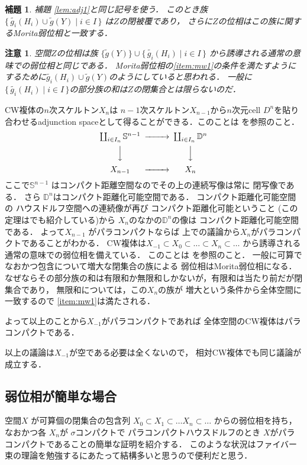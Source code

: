 \documentclass[leqno, a4paper, 12pt]{jsarticle}
\newtheorem{lem}[thm]{補題}
\newtheorem*{rmk}{注意}
\begin{document}
\begin{lem}
補題
\ref{lem:adj1}と同じ記号を使う．
このとき族$\{\, \widetilde{g_{i}}(H_{i})\cup \widetilde{g}(Y)\mid i\in I\, \}$
は$Z$の閉被覆であり，
さらに$Z$の位相はこの族に関するMorita弱位相と一致する．
\end{lem}
\begin{rmk}
空間$Z$の位相は族
$\{\widetilde{g}(Y)\}\cup \{\, \widetilde{g_{i}}(H_{i})\mid i\in I\, \}$
から誘導される通常の意味での弱位相と同じである．
Morita弱位相の\ref{item:mw1}の条件を満たすようにするために$\widetilde{g_{i}}(H_{i})\cup \widetilde{g}(Y)$のようにしていると思われる．
一般に$ \{\, \widetilde{g_{i}}(H_{i})\mid i\in I\, \}$の部分族の和は$Z$の閉集合とは限らないのだ．
\end{rmk}

CW複体の$n$次スケルトン$X_{n}$は
$n-1$次スケルトン$X_{n-1}$から$n$次元cell
$D^{n}$を貼り合わせるadjunction spaceとして得ることができる．このことは
\cite[Theorem 2.4, p.47]{MR3822092}を参照のこと．
\[
  \begin{CD}
     \coprod_{i\in I_{n}}\mathbb{S}^{n-1} @>>> \coprod_{i\in I_{n}}\mathbb{D}^{n} \\
  @VVV    @VVV \\
     X_{n-1}   @>>>  X_{n}
  \end{CD}
\]
ここで$\mathbb{S}^{n-1}$
はコンパクト距離空間なのでその上の連続写像は常に
閉写像である．
さら
$\mathbb{D}^{n}$はコンパクト距離化可能空間である．
コンパクト距離化可能空間の
ハウスドルフ空間への連続像が再び
コンパクト距離化可能ということ
(この定理は\cite{Den3}でも紹介している)から
$X_{n}$のなかの$\mathbb{D}^{n}$の像は
コンパクト距離化可能空間である．
よって$X_{n-1}$
がパラコンパクトならば
上での議論から$X_{n}$がパラコンパクトであることがわかる．
CW複体は$X_{-1}\subset X_{0}\subset \dots \subset X_{n}\subset \dots $
から誘導される通常の意味での弱位相を備えている．
このことは
\cite[Theorem 2.4, p.47]{MR3822092}を参照のこと．
一般に可算でなおかつ包含について増大な閉集合の族による
弱位相はMorita弱位相になる．なぜならその部分族の和は有限和か無限和しかないが，有限和は当たり前だが閉集合であり，
無限和については，この$X_{n}$の族が
増大という条件から全体空間に一致するので
\ref{item:mw1}は満たされる．


よって以上のことから$X_{-1}$がパラコンパクトであれば
全体空間のCW複体はパラコンパクトである．


以上の議論は$X_{-1}$が空である必要は全くないので，
相対CW複体でも同じ議論が成立する．


\subsection{弱位相が簡単な場合}
空間$X$
が可算個の閉集合の包含列
$X_{0}\subset X_{1}\subset \dots X_{n}\subset \dots$
からの弱位相を持ち，なおかつ各
$X_{n}$が
$\sigma$コンパクトで
パラコンパクトハウスドルフのとき
$X$がパラコンパクトであることの簡単な証明を紹介する．
このような状況はファイバー束の理論を勉強するにあたって結構多いと思うので便利だと思う．
\end{document}
